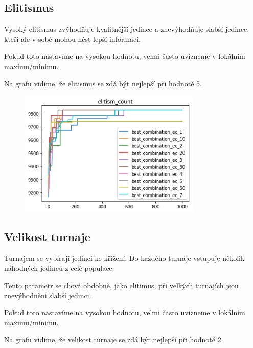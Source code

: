 \documentclass[a4paper,10pt,twocolumn]{article}
\begin{document}
\begin{itemize}
\begin{itemize}
\subsection{Elitismus}

Vysoký elitismus zvýhodňuje kvalitnější jedince a znevýhodňuje slabší jedince, kteří ale v sobě mohou nést lepší informaci.

Pokud toto nastavíme na vysokou hodnotu, velmi často uvízneme v lokálním maximu/minimu.

Na grafu vidíme, že elitismus se zdá být nejlepší při hodnotě 5.


\begin{figure}[H]
  \begin{center}
    \includegraphics[height=6cm]{graphs/elitism_count.png}
  \end{center}
\end{figure}


\subsection{Velikost turnaje}

Turnajem se vybírají jedinci ke křížení. Do každého turnaje vstupuje několik náhodných jedinců z celé populace.

Tento parametr se chová obdobně, jako elitimus, při velkých turnajích jsou znevýhodněni slabší jedinci.

Pokud toto nastavíme na vysokou hodnotu, velmi často uvízneme v lokálním maximu/minimu.

Na grafu vidíme, že velikost turnaje se zdá být nejlepší při hodnotě 2.



\end{itemize}
\end{itemize}
\end{document}
